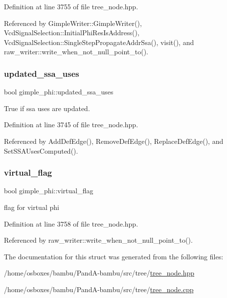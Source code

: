 Definition at line 3755 of file tree\+\_\+node.\+hpp.



Referenced by Gimple\+Writer\+::\+Gimple\+Writer(), Vcd\+Signal\+Selection\+::\+Initial\+Phi\+Res\+Is\+Address(), Vcd\+Signal\+Selection\+::\+Single\+Step\+Propagate\+Addr\+Ssa(), visit(), and raw\+\_\+writer\+::write\+\_\+when\+\_\+not\+\_\+null\+\_\+point\+\_\+to().

\mbox{\label{structgimple__phi_ae1f74d913443a51ae48cf93062419b6a}} 
\subsubsection{\texorpdfstring{updated\+\_\+ssa\+\_\+uses}{updated\_ssa\_uses}}
{\footnotesize\ttfamily bool gimple\+\_\+phi\+::updated\+\_\+ssa\+\_\+uses\hspace{0.3cm}{\ttfamily [private]}}



True if ssa uses are updated. 



Definition at line 3745 of file tree\+\_\+node.\+hpp.



Referenced by Add\+Def\+Edge(), Remove\+Def\+Edge(), Replace\+Def\+Edge(), and Set\+S\+S\+A\+Uses\+Computed().

\mbox{\label{structgimple__phi_a57b24c6fdd3c1cb83ba51060a669cdd0}} 
\subsubsection{\texorpdfstring{virtual\+\_\+flag}{virtual\_flag}}
{\footnotesize\ttfamily bool gimple\+\_\+phi\+::virtual\+\_\+flag}



flag for virtual phi 



Definition at line 3758 of file tree\+\_\+node.\+hpp.



Referenced by raw\+\_\+writer\+::write\+\_\+when\+\_\+not\+\_\+null\+\_\+point\+\_\+to().



The documentation for this struct was generated from the following files\+:\begin{DoxyCompactItemize}
\item 
/home/osboxes/bambu/\+Pand\+A-\/bambu/src/tree/\hyperlink{tree__node_8hpp}{tree\+\_\+node.\+hpp}\item 
/home/osboxes/bambu/\+Pand\+A-\/bambu/src/tree/\hyperlink{tree__node_8cpp}{tree\+\_\+node.\+cpp}\end{DoxyCompactItemize}
